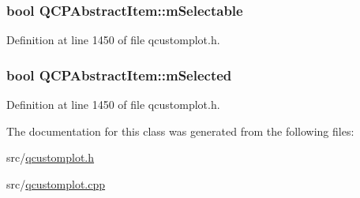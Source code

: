 \hypertarget{class_q_c_p_abstract_item_ad81eb35c8726a0f458db9df9732e0e41}{
\subsubsection[{m\-Selectable}]{\setlength{\rightskip}{0pt plus 5cm}bool Q\-C\-P\-Abstract\-Item\-::m\-Selectable\hspace{0.3cm}{\ttfamily [protected]}}}\label{class_q_c_p_abstract_item_ad81eb35c8726a0f458db9df9732e0e41}


Definition at line 1450 of file qcustomplot.\-h.

\hypertarget{class_q_c_p_abstract_item_a4bdb3457dad1d268c0f78a44152b9645}{
\subsubsection[{m\-Selected}]{\setlength{\rightskip}{0pt plus 5cm}bool Q\-C\-P\-Abstract\-Item\-::m\-Selected\hspace{0.3cm}{\ttfamily [protected]}}}\label{class_q_c_p_abstract_item_a4bdb3457dad1d268c0f78a44152b9645}


Definition at line 1450 of file qcustomplot.\-h.



The documentation for this class was generated from the following files\-:\begin{DoxyCompactItemize}
\item 
src/\hyperlink{qcustomplot_8h}{qcustomplot.\-h}\item 
src/\hyperlink{qcustomplot_8cpp}{qcustomplot.\-cpp}\end{DoxyCompactItemize}
